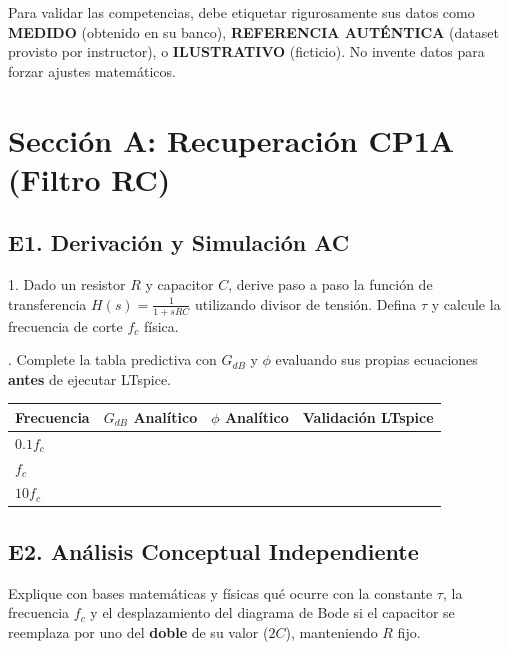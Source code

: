 \documentclass[11pt, a4paper]{article}
\begin{document}
\begin{tcolorbox}[colback=red!5, colframe=red!80!black, title=\textbf{ATENCIÓN: Validez de la Evidencia}]
    Para validar las competencias, debe etiquetar rigurosamente sus datos como \textbf{MEDIDO} (obtenido en su banco), \textbf{REFERENCIA AUTÉNTICA} (dataset provisto por instructor), o \textbf{ILUSTRATIVO} (ficticio). No invente datos para forzar ajustes matemáticos.
\end{tcolorbox}

\section*{Sección A: Recuperación CP1A (Filtro RC)}
\subsection*{E1. Derivación y Simulación AC}
1. Dado un resistor $R$ y capacitor $C$, derive paso a paso la función de transferencia $H(s) = \frac{1}{1+sRC}$ utilizando divisor de tensión. Defina $\tau$ y calcule la frecuencia de corte $f_c$ física. \vspace{3.5cm}

. Complete la tabla predictiva con $G_{dB}$ y $\phi$ evaluando sus propias ecuaciones \textbf{antes} de ejecutar LTspice.
\begin{center}
\begin{tabularx}{0.8\textwidth}{@{} X l l l @{}}
\toprule
\textbf{Frecuencia} & \textbf{$G_{dB}$ Analítico} & \textbf{$\phi$ Analítico} & \textbf{Validación LTspice} \\ \midrule
$0.1 f_c$ & & & \\ \addlinespace[10pt]
$f_c$ & & & \\ \addlinespace[10pt]
$10 f_c$ & & & \\ \bottomrule
\end{tabularx}
\end{center}

\subsection*{E2. Análisis Conceptual Independiente}
Explique con bases matemáticas y físicas qué ocurre con la constante $\tau$, la frecuencia $f_c$ y el desplazamiento del diagrama de Bode si el capacitor se reemplaza por uno del \textbf{doble} de su valor ($2C$), manteniendo $R$ fijo. \vspace{2.5cm}

\newpage
\end{document}
